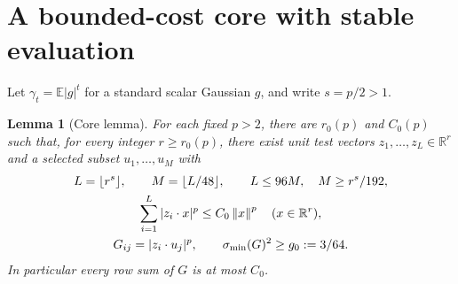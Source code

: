 \documentclass[11pt]{article}
\newtheorem{lemma}[theorem]{Lemma}
\theoremstyle{remark}\newtheorem{remark}[theorem]{Remark}
\newcommand{\R}{\mathbb R}\newcommand{\E}{\mathbb E}\newcommand{\Prob}{\mathbb P}
\begin{document}
\section{A bounded-cost core with stable evaluation}\label{sec:core}
Let $\gamma_t=\E|g|^t$ for a standard scalar Gaussian $g$, and write $s=p/2>1$.
\begin{lemma}[Core lemma]\label{lem:core}
For each fixed $p>2$, there are $r_0(p)$ and $C_0(p)$ such that, for every integer $r\ge r_0(p)$, there exist unit test vectors $z_1,\ldots,z_L\in\R^r$ and a selected subset $u_1,\ldots,u_M$ with
\begin{gather}
 L=\lfloor r^s\rfloor,\qquad M=\lfloor L/48\rfloor,
 \qquad L\le96M,\quad M\ge r^s/192,\label{eq:corecount}\\
 \sum_{i=1}^L|z_i\cdot x|^p\le C_0\norm x^p\quad(x\in\R^r),\label{eq:coremoment}\\
 G_{ij}=|z_i\cdot u_j|^p,\qquad \sigma_{\min}(G)^2\ge g_0:=3/64.\label{eq:corestable}
\end{gather}
In particular every row sum of $G$ is at most $C_0$.
\end{lemma}
\end{document}

